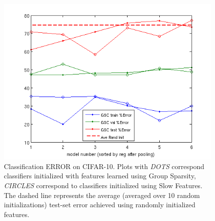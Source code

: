 \documentclass[12pt,a4paper]{report}
\begin{document}
\begin{figure}[ht]
\centering 
\includegraphics[scale=0.8]{class_graph.png}
\caption{Classification ERROR on CIFAR-10. Plots with \emph{DOTS} correspond classifiers initialized with features learned using Group Sparsity, \emph{CIRCLES} correspond to classifiers initialized using Slow Features. The dashed line represents the average (averaged over 10 random initializations) test-set error achieved using randomly initialized features.}  
\end{figure} 
\end{document}
